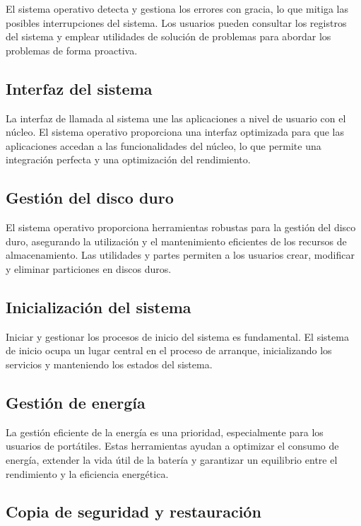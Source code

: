 \documentclass[a4paper]{article} %
\begin{document}
El sistema operativo detecta y gestiona los errores con gracia, lo que mitiga las posibles interrupciones del sistema. Los usuarios pueden consultar los registros del sistema y emplear utilidades de solución de problemas para abordar los problemas de forma proactiva.

\subsection{Interfaz del sistema}

La interfaz de llamada al sistema une las aplicaciones a nivel de usuario con el núcleo. El sistema operativo proporciona una interfaz optimizada para que las aplicaciones accedan a las funcionalidades del núcleo, lo que permite una integración perfecta y una optimización del rendimiento.

\subsection{Gestión del disco duro}

El sistema operativo proporciona herramientas robustas para la gestión del disco duro, asegurando la utilización y el mantenimiento eficientes de los recursos de almacenamiento. Las utilidades y partes permiten a los usuarios crear, modificar y eliminar particiones en discos duros.

\subsection{Inicialización del sistema}

Iniciar y gestionar los procesos de inicio del sistema es fundamental. El sistema de inicio ocupa un lugar central en el proceso de arranque, inicializando los servicios y manteniendo los estados del sistema.

\subsection{Gestión de energía}

La gestión eficiente de la energía es una prioridad, especialmente para los usuarios de portátiles. Estas herramientas ayudan a optimizar el consumo de energía, extender la vida útil de la batería y garantizar un equilibrio entre el rendimiento y la eficiencia energética.

\subsection{Copia de seguridad y restauración}
\end{document}
